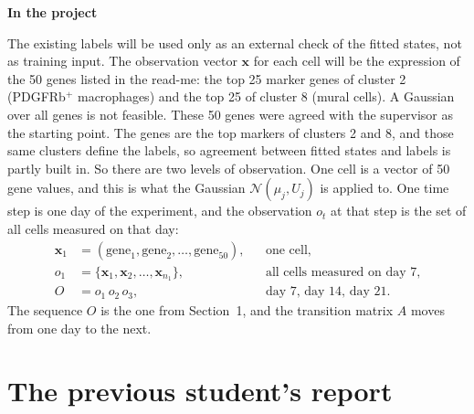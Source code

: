 \documentclass[10pt,a4paper]{article}
\newcommand{\sub}[1]{\vspace{1pt}\textbf{\textcolor{gray!80!black}{#1}}\par}
\begin{document}
\sub{In the project}
The existing labels will be used only as an external check of the fitted states, not as training input. The observation vector $\mathbf{x}$ for each cell will be the expression of the 50 genes listed in the read-me: the top 25 marker genes of cluster 2 (PDGFRb$^{+}$ macrophages) and the top 25 of cluster 8 (mural cells). A Gaussian over all genes is not feasible. These 50 genes were agreed with the supervisor as the starting point. The genes are the top markers of clusters 2 and 8, and those same clusters define the labels, so agreement between fitted states and labels is partly built in. So there are two levels of observation. One cell is a vector of 50 gene values, and this is what the Gaussian $\mathcal{N}(\mu_j, U_j)$ is applied to. One time step is one day of the experiment, and the observation $o_t$ at that step is the set of all cells measured on that day:
\begin{align*}
\mathbf{x}_1 &= (\text{gene}_1, \text{gene}_2, \ldots, \text{gene}_{50}), && \text{one cell,} \\
o_1 &= \{\mathbf{x}_1, \mathbf{x}_2, \ldots, \mathbf{x}_{n_1}\}, && \text{all cells measured on day 7,} \\
O &= o_1\, o_2\, o_3, && \text{day 7, day 14, day 21.}
\end{align*}
The sequence $O$ is the one from Section~1, and the transition matrix $A$ moves from one day to the next.

\newpage
\section{The previous student's report}
\end{document}
